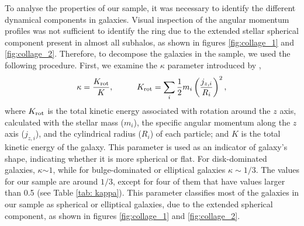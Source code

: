 \documentclass[fleqn,usenatbib]{mnras}
\begin{document}
To analyse the properties of our sample, it was necessary to identify the different dynamical components in galaxies. Visual inspection of the angular momentum profiles was not sufficient to identify the ring due to the extended stellar spherical component present in almost all subhalos, as shown in figures \ref{fig:collage_1} and \ref{fig:collage_2}. {Therefore, to decompose the galaxies in the sample, we used the following procedure.}
First, we examine the $\kappa$ {parameter} introduced by \cite{Sales_2012},
%
\begin{equation}\label{eq: kappa}
    \kappa=\dfrac{K_{\rm rot}}{K}, \hspace{1cm} K_{\rm rot}= \sum_i \dfrac{1}{2} m_i \left( \dfrac{j_{z,i}}{R_i} \right)^2,
\end{equation}
%
where $K_{\rm rot}$ is the total kinetic energy associated with rotation around the $z$ axis, calculated with the stellar mass ($m_i$), the specific angular momentum along the $z$ axis ($j_{z,i}$), and the cylindrical radius ($R_i$) of each particle{; and} $K$ is the total kinetic energy of the galaxy. This parameter is used as an indicator of galaxy's shape, indicating whether it is more spherical or flat. For {disk-dominated} galaxies, $\kappa {\sim 1}$, while for bulge-dominated or elliptical galaxies ${\kappa \sim} 1/3$. The values for our sample are around $1/3$, except for four of them that have values larger than 0.5 (see {Table} \ref{tab: kappa}). This parameter classifies most of the galaxies in our sample as spherical or elliptical galaxies, due to the extended spherical component, as shown in figures \ref{fig:collage_1} and \ref{fig:collage_2}. 
\end{document}
